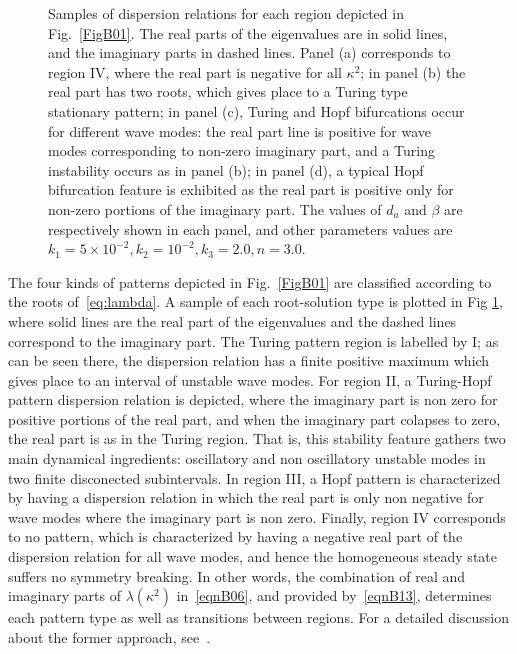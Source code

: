 \documentclass[11pt]{article}
\begin{document}
\begin{figure}[t!]
	\caption{Samples of dispersion relations for each region depicted in Fig.~\ref{FigB01}. The real parts of the eigenvalues are in solid lines, and the imaginary parts in dashed lines.  Panel (a) corresponds to region IV, where the real part is negative for all $\kappa^2$; in panel (b) the real part has two roots, which gives place to a Turing type stationary pattern; in panel (c), Turing and Hopf bifurcations occur for different wave modes: the real part line is positive for wave modes corresponding to non-zero imaginary part, and a Turing instability occurs as in panel (b); in  panel (d), a typical Hopf bifurcation feature is exhibited as the real part is positive only for non-zero portions of the imaginary part. The values of $d_a$ and $\beta$ are respectively shown in each panel, and other parameters values are $k_1=5\times10^{-2}, k_2=10^{-2}, k_3=2.0, n=3.0$.}
	\label{FigB02}
\end{figure}

The four kinds of patterns depicted in Fig.~\ref{FigB01} are classified according to the roots of~\eqref{eq:lambda}. A sample of each root-solution type is plotted in Fig \ref{FigB02}, where solid lines are  the real part of the eigenvalues and the dashed lines correspond to the imaginary part. The Turing pattern region is labelled by I; as can be seen there, the dispersion relation has a finite positive maximum which gives place to an interval of unstable wave modes. For region II, a Turing-Hopf pattern dispersion relation is depicted, where the imaginary part is non zero for positive portions of the real part, and when the imaginary part colapses to zero, the real part is as in the Turing region. That is, this stability feature gathers two main dynamical ingredients: oscillatory and non oscillatory unstable modes in two finite disconected subintervals. In region III, a Hopf pattern is characterized by having a dispersion relation in which the real part is only non negative for wave modes where the imaginary part is non zero. Finally, region IV corresponds to no pattern, which is characterized by having a negative real part of the dispersion relation for all wave modes, and hence the homogeneous steady state suffers no symmetry breaking. In other words, the combination of real and imaginary parts of $\lambda(\kappa^2)$ in~\eqref{eqnB06}, and provided by~\eqref{eqnB13}, determines each pattern type as well as transitions between regions. For a detailed discussion about the former approach, see~\citep{liu}.
\end{document}
